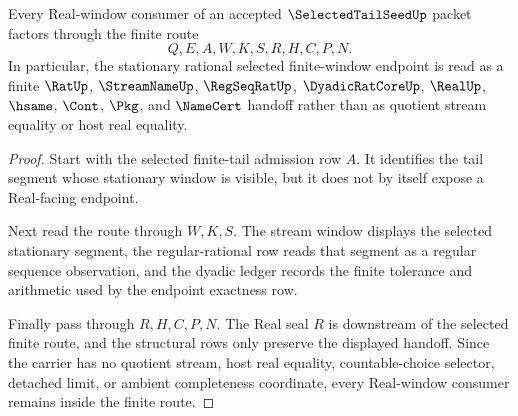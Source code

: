 \begin{theorem}
\label{thm:selected-tail-seed-real-window-handoff}
Every Real-window consumer of an accepted $\SelectedTailSeedUp$ packet factors through the finite route
$$
Q,E,A,W,K,S,R,H,C,P,N.
$$
In particular, the stationary rational selected finite-window endpoint is read as a finite $\RatUp$, $\StreamNameUp$, $\RegSeqRatUp$, $\DyadicRatCoreUp$, $\RealUp$, $\hsame$, $\Cont$, $\Pkg$, and $\NameCert$ handoff rather than as quotient stream equality or host real equality.
\end{theorem}
\begin{proof}
Start with the selected finite-tail admission row $A$. It identifies the tail segment whose stationary window is visible, but it does not by itself expose a Real-facing endpoint.

Next read the route through $W,K,S$. The stream window displays the selected stationary segment, the regular-rational row reads that segment as a regular sequence observation, and the dyadic ledger records the finite tolerance and arithmetic used by the endpoint exactness row.

Finally pass through $R,H,C,P,N$. The Real seal $R$ is downstream of the selected finite route, and the structural rows only preserve the displayed handoff. Since the carrier has no quotient stream, host real equality, countable-choice selector, detached limit, or ambient completeness coordinate, every Real-window consumer remains inside the finite route.
\end{proof}

